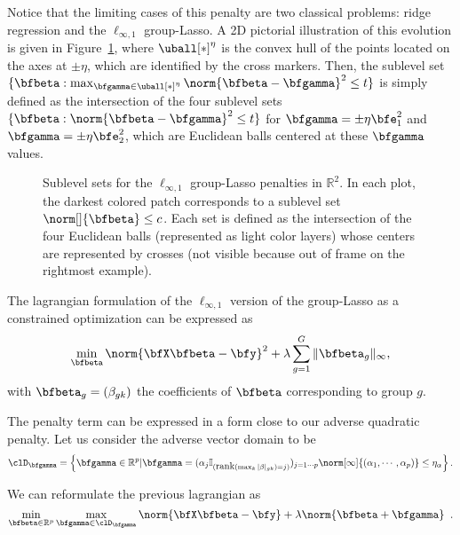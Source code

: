 Notice that the limiting cases of this penalty are two classical problems: ridge
regression and the $\ell_{\infty,1}$ group-Lasso.
A 2D pictorial illustration of this evolution is given in
Figure~\ref{fig:group-penalty}, where $\uball[*]^\eta$ is the convex hull of the
points located on the axes at $\pm \eta$, which are identified by the cross
markers.
Then, the sublevel set 
$\{\bfbeta : \max_{\bfgamma \in \uball[*]^\eta} \norm{\bfbeta-\bfgamma}^2 \leq t\}$
is simply defined as the intersection of the four sublevel sets
$\{\bfbeta : \norm{\bfbeta - \bfgamma}^2 \leq t\}$ for 
$\bfgamma=\pm \eta\bfe^{2}_1$ and $\bfgamma=\pm \eta\bfe^{2}_2$,
which are Euclidean balls centered at these $\bfgamma$ values.
%
\begin{figure}
  \begin{center} 
    \caption{Sublevel sets for the $\ell_{\infty,1}$ group-Lasso penalties in $\mathbb{R}^2$.
             In each plot, the darkest colored patch corresponds to a sublevel set $\norm[]{\bfbeta} \leq c$.
             Each set is defined as the intersection of the four Euclidean balls
             (represented as light color layers) whose centers are
             represented by crosses (not visible because out of frame on the 
             rightmost example).}
    \label{fig:group-penalty}
    \end{center} 
\end{figure}

\iffalse
The  lagrangian formulation  of the  $\ell_{\infty,1}$ version  of the
group-Lasso as a constrained optimization can be expressed as
$$
 \min_{\bfbeta}     \norm{\bfX  \bfbeta  - \bfy  }^2+\lambda \sum_{g=1}^G \|\bfbeta_g\|_\infty,
$$
with $\bfbeta_g=(\beta_{gk})$ the coefficients of $\bfbeta$ corresponding to group $g$.


The penalty term can be expressed in a form close to our adverse quadratic penalty. Let us consider  the adverse vector domain to be
$$
 \clD_{\bfgamma}=\left\{ \bfgamma \in \mathbb{R}^p | \bfgamma= 
(\alpha_j \mathbb{I}_{(\mbox{rank}\left(  \max_k |\beta|_{gk}\right)=j) })_{j=1
      \cdots p } 
\norm[\infty]{(\alpha_1,\cdots,\alpha_p)} \leq \eta_\alpha \right\} .
$$

We can reformulate the previous lagrangian as 
\begin{equation}
    \min_{\bfbeta\in\mathbb{R}^p} \max_{\bfgamma \in \clD_{\bfgamma}}
    \norm{\bfX \bfbeta - \bfy } + \lambda \norm{\bfbeta +
    \bfgamma } \enspace.
\end{equation}

